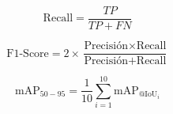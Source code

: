 \begin{equation} \label{eq:recall}
    \text{Recall} = \frac{TP}{TP + FN}
\end{equation}

\begin{equation} \label{eq:f1}
    \text{F1-Score} = 2 \times \frac{\text{Precisión} \times \text{Recall}}{\text{Precisión} + \text{Recall}}
\end{equation}

\begin{equation}
\text{mAP}_{50-95} = \frac{1}{10} \sum_{i=1}^{10} \text{mAP}_{@\text{IoU}_i}
\end{equation}